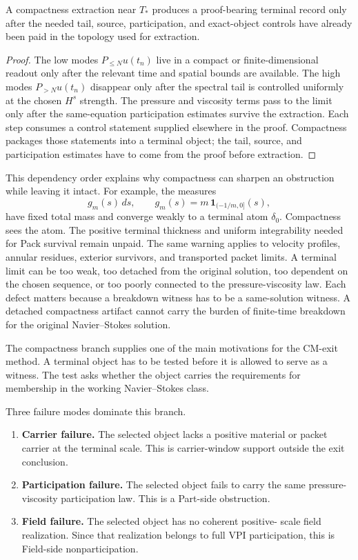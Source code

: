 \begin{proposition}
A compactness extraction near \(T_*\) produces a proof-bearing terminal record
only after the needed tail, source, participation, and exact-object controls
have already been paid in the topology used for extraction.
\end{proposition}

\begin{proof}
The low modes \(P_{\leq N}u(t_n)\) live in a compact or finite-dimensional
readout only after the relevant time and spatial bounds are available.
The high modes \(P_{>N}u(t_n)\) disappear only after the spectral tail is
controlled uniformly at the chosen \(H^s\) strength.
The pressure and viscosity terms pass to the limit only after the same-equation
participation estimates survive the extraction.
Each step consumes a control statement supplied elsewhere in the proof.
Compactness packages those statements into a terminal object; the tail, source,
and participation estimates have to come from the proof before extraction.
\end{proof}

This dependency order explains why compactness can sharpen an obstruction
while leaving it intact.
For example, the measures
\[
  g_m(s)\,ds,\qquad g_m(s)=m\,\mathbf 1_{(-1/m,0]}(s),
\]
have fixed total mass and converge weakly to a terminal atom \(\delta_0\).
Compactness sees the atom.
The positive terminal thickness and uniform integrability needed for Pack
survival remain unpaid.
The same warning applies to velocity profiles, annular residues, exterior
survivors, and transported packet limits.
A terminal limit can be too weak, too detached from the original solution, too
dependent on the chosen sequence, or too poorly connected to the
pressure-viscosity law.
Each defect matters because a breakdown witness has to be a same-solution
witness.
A detached compactness artifact cannot carry the burden of finite-time
breakdown for the original Navier--Stokes solution.

The compactness branch supplies one of the main motivations for the CM-exit
method.
A terminal object has to be tested before it is allowed to serve as a witness.
The test asks whether the object carries the requirements for membership in the
working Navier--Stokes class.

Three failure modes dominate this branch.

\begin{enumerate}[leftmargin=*]
\item \textbf{Carrier failure.} The selected object lacks a positive material or
      packet carrier at the terminal scale. This is carrier-window support outside the exit conclusion.
\item \textbf{Participation failure.} The selected object fails to carry the same
      pressure-viscosity participation law. This is a Part-side obstruction.
\item \textbf{Field failure.} The selected object has no coherent positive-
      scale field realization.  Since that realization belongs to full VPI
      participation, this is Field-side nonparticipation.
\end{enumerate}

